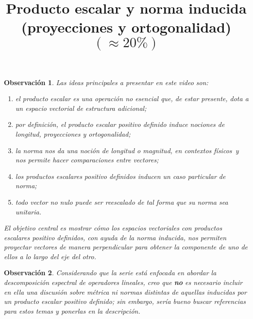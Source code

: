 \documentclass[12pt,dvipsnames]{article}
\newtheorem{obs}{Observación}[section]
\numberwithin{equation}{section}
\begin{document}
\title{Producto escalar y norma inducida \\ (proyecciones y ortogonalidad) \\ $(\approx 20\%)$}
\date{}
\maketitle

\begin{obs}

Las ideas principales a presentar en este video son:
\begin{enumerate}[label=(\roman*)]
    
    \item el producto escalar es una operación no esencial que, de estar presente, dota a un espacio vectorial de estructura adicional;
    
    \item por definición, el producto escalar positivo definido induce nociones de longitud, proyecciones y ortogonalidad;
    
    \item la norma nos da una noción de longitud \textemdash o magnitud, en contextos físicos\textemdash \ y nos permite hacer comparaciones entre vectores;
    
    \item los productos escalares positivo definidos inducen un caso particular de norma;
    
    \item todo vector no nulo puede ser reescalado de tal forma que su norma sea unitaria.
\end{enumerate}

El objetivo central es mostrar cómo los espacios vectoriales con productos escalares positivo definidos, con ayuda de la norma inducida, nos permiten proyectar vectores de manera perpendicular para obtener la componente de uno de ellos a lo largo del eje del otro.
\end{obs}

\begin{obs}
Considerando que la serie está enfocada en abordar la descomposición espectral de operadores lineales, creo que \textbf{no} es necesario incluir en ella una discusión sobre métrica ni normas distintas de aquellas inducidas por un producto escalar positivo definido; sin embargo, sería bueno buscar referencias para estos temas y ponerlas en la descripción.
\end{obs}
\end{document}
